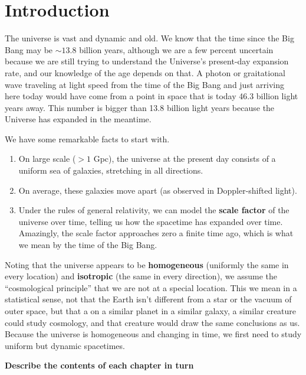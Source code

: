 \chapter*{Introduction}

The universe is vast and dynamic and old.  We know that the time since the Big Bang may be $\sim 13.8$ billion years, although we are a few percent uncertain because we are still trying to understand the Universe's present-day expansion rate, and our knowledge of the age depends on that.  A photon or graitational wave traveling at light speed from the time of the Big Bang and just arriving here today would have come from a point in space that is today 46.3 billion light years away.  This number is bigger than 13.8 billion light years because the Universe has expanded in the meantime.  

We have some remarkable facts to start with.
\begin{enumerate}
  \item On large scale ($>1$ Gpc), the universe at the present day consists of a uniform sea of galaxies, stretching in all directions.
  \item On average, these galaxies move apart (as observed in Doppler-shifted light).
  \item Under the rules of general relativity, we can model the \textbf{scale factor} of the universe over time, telling us how the spacetime has expanded over time.  Amazingly, the scale factor approaches zero a finite time ago, which is what we mean by the time of the Big Bang.
\end{enumerate}

Noting that the universe appears to be \textbf{homogeneous} (uniformly the same in every location) and \textbf{isotropic} (the same in every direction), we assume the ``cosmological principle'' that we are not at a special location.  This we mean in a statistical sense, not that the Earth isn't different from a star or the vacuum of outer space, but that a on a similar planet in a similar galaxy, a similar creature could study cosmology, and that creature would draw the same conclusions as us.  Because the universe is homogeneous and changing in time, we first need to study uniform but dynamic spacetimes.

\textbf{Describe the contents of each chapter in turn}
